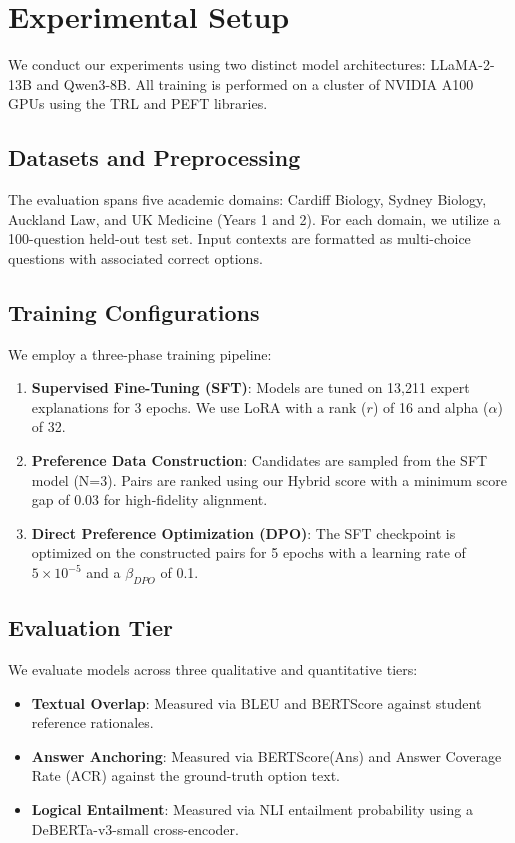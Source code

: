 \section{Experimental Setup}

We conduct our experiments using two distinct model architectures: LLaMA-2-13B and Qwen3-8B. All training is performed on a cluster of NVIDIA A100 GPUs using the TRL and PEFT libraries.

\subsection{Datasets and Preprocessing}
The evaluation spans five academic domains: Cardiff Biology, Sydney Biology, Auckland Law, and UK Medicine (Years 1 and 2). For each domain, we utilize a 100-question held-out test set. Input contexts are formatted as multi-choice questions with associated correct options.

\subsection{Training Configurations}
We employ a three-phase training pipeline:
\begin{enumerate}
    \item \textbf{Supervised Fine-Tuning (SFT)}: Models are tuned on 13,211 expert explanations for 3 epochs. We use LoRA with a rank ($r$) of 16 and alpha ($\alpha$) of 32.
    \item \textbf{Preference Data Construction}: Candidates are sampled from the SFT model (N=3). Pairs are ranked using our Hybrid score with a minimum score gap of 0.03 for high-fidelity alignment.
    \item \textbf{Direct Preference Optimization (DPO)}: The SFT checkpoint is optimized on the constructed pairs for 5 epochs with a learning rate of $5 \times 10^{-5}$ and a $\beta_{DPO}$ of 0.1.
\end{enumerate}

\subsection{Evaluation Tier}
We evaluate models across three qualitative and quantitative tiers:
\begin{itemize}
    \item \textbf{Textual Overlap}: Measured via BLEU and BERTScore against student reference rationales.
    \item \textbf{Answer Anchoring}: Measured via BERTScore(Ans) and Answer Coverage Rate (ACR) against the ground-truth option text.
    \item \textbf{Logical Entailment}: Measured via NLI entailment probability using a DeBERTa-v3-small cross-encoder.
\end{itemize}

